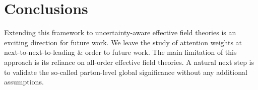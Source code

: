 \section{Conclusions}\label{sec:conclusions}

Extending this framework to uncertainty-aware effective field theories
is an exciting direction for future work. We leave the study of
attention weights at next-to-next-to-leading & order to future work. The
main limitation of this approach is its reliance on all-order effective
field theories. A natural next step is to validate the so-called
parton-level global significance without any additional assumptions.


